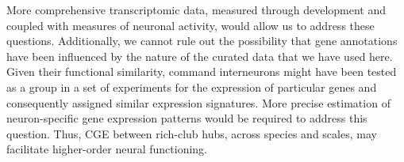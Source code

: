 \documentclass[10pt,letterpaper]{article}
\begin{document}
{More comprehensive transcriptomic data, measured through development and coupled with measures of neuronal activity, would allow us to address these questions.
Additionally, we cannot rule out the possibility that gene annotations have been influenced by the nature of the curated data that we have used here.
Given their functional similarity, command interneurons might have been tested as a group in a set of experiments for the expression of particular genes and consequently assigned similar expression signatures.
More precise estimation of neuron-specific gene expression patterns would be required to address this question.
Thus, CGE between rich-club hubs, across species and scales, may facilitate higher-order neural functioning.




}
\end{document}
